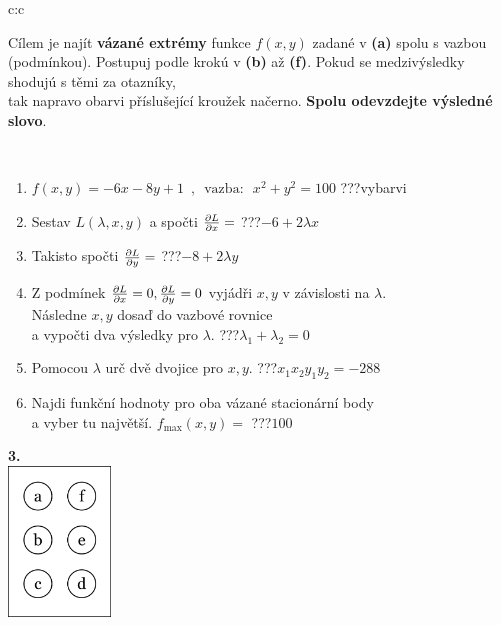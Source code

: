 \documentclass[10pt]{report}
\begin{document}
\begin{tabular}{c:c}
\begin{minipage}[c][104.5mm][t]{0.5\linewidth}
\begin{center}
\begin{minipage}{0.95\linewidth}
\begin{center}
Cílem je najít \textbf{vázané extrémy} funkce $f(x,y)$ zadané v \textbf{(a)} spolu s vazbou (podmínkou). Postupuj podle krokú v \textbf{(b)} až \textbf{(f)}. Pokud se medzivýsledky shodujú s těmi za otazníky,\\tak napravo obarvi příslušející kroužek načerno. \textbf{Spolu odevzdejte výsledné slovo}.
\end{center}
\end{minipage}
\\[1mm]
\begin{minipage}{0.79\linewidth}
\begin{center}
\begin{varwidth}{\linewidth}
\begin{enumerate}
\normalsize
\item $f(x,y)=-6x-8y+1 \enspace , \enspace \mathrm{vazba:} \enspace x^2+y^2=100$\quad \dotfill\; ???\;\dotfill \quad vybarvi
\item Sestav $L(\lambda,x,y)$ a spočti $\pdv{L}{x}=$\quad \dotfill\; ???\;\dotfill \quad $-6+2\lambda x$
\item Takisto spočti $\pdv{L}{y}=$\quad \dotfill\; ???\;\dotfill \quad $-8+2\lambda y$
\item Z podmínek $\pdv{L}{x}=0 , \pdv{L}{y}=0$ vyjádři $x,y$ v závislosti na $\lambda$.\\ \phantom{xxxxxx}Následne $x,y$ dosaď do vazbové rovnice\\ \phantom{xxxxxx}a vypočti dva výsledky pro $\lambda$.\quad \dotfill\; ???\;\dotfill \quad $\lambda_1+\lambda_2=0$
\item Pomocou $\lambda$ urč dvě dvojice pro $x,y$.\quad \dotfill\; ???\;\dotfill \quad $x_1 x_2 y_1 y_2=-288$
\item Najdi funkční hodnoty pro oba vázané stacionární body\\ \phantom{xxxxxx}a vyber tu najvětší. $f_{\text{max}}(x,y)=$\quad \dotfill\; ???\;\dotfill \quad $100$
\end{enumerate}
\end{varwidth}
\end{center}
\end{minipage}
\begin{minipage}{0.20\linewidth}
\begin{center}
{\Huge\bfseries 3.} \\[2mm]
\includegraphics[height=40mm]{../images/braille.png}

\end{center}
\end{minipage}
\end{center}
\end{minipage}
\end{tabular}
\end{document}
